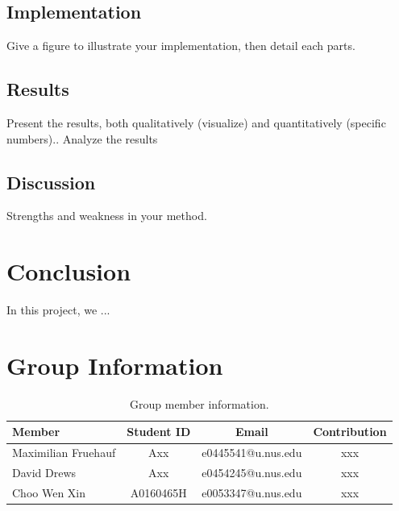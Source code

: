 \documentclass[11pt]{article}
\begin{document}
\subsection{Implementation}
Give a figure to illustrate your implementation, then detail each parts.

\subsection{Results}
Present the results, both qualitatively (visualize) and quantitatively (specific numbers)..
Analyze the results
\subsection{Discussion}
Strengths and weakness in your method.

\section{Conclusion}
In this project, we ...

\section{Group Information}
\begin{table}[ht]
    \centering
    \begin{tabular}{l|c|c|c}
    \hline
     Member & Student ID & Email & Contribution\\
    \hline
    Maximilian Fruehauf& Axx & e0445541@u.nus.edu & xxx \\
    David Drews& Axx &e0454245@u.nus.edu & xxx  \\
    Choo Wen Xin& A0160465H & e0053347@u.nus.edu & xxx  \\
    \hline
    \end{tabular}
    \caption{Group member information.}
    \label{tab:dataset}
\end{table}



 
\end{document}
